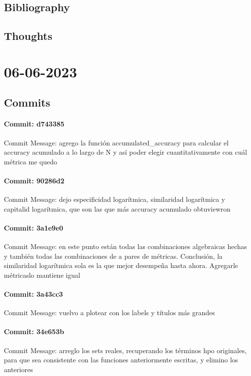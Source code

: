 \documentclass{article}
\begin{document}
\subsection{Bibliography}
\subsection{Thoughts}

\section{06-06-2023}
\subsection{Commits}
\paragraph{Commit: d743385}
Commit Message: agrego la función accumulated_accuracy para calcular el accuracy acumulado a lo largo de N y así poder elegir cuantitativamente con cuál métrica me quedo

\paragraph{Commit: 90286d2}
Commit Message: dejo especificidad logarítmica, similaridad logarítmica y capitalid logarítmica, que son las que más accuracy acumulado obtuviewron

\paragraph{Commit: 3a1e9e0}
Commit Message: en este punto están todas las combinaciones algebraicas hechas y también todas las combinaciones de a pares de métricas. Conclusión, la similaridad logarítmica sola es la que mejor desempeña hasta ahora. Agregarle métricaslo mantiene igual

\paragraph{Commit: 3a43cc3}
Commit Message: vuelvo a plotear con los labels y títulos más grandes

\paragraph{Commit: 34e653b}
Commit Message: arreglo los sets reales, recuperando los términos hpo originales, para que sea consistente con las funciones anteriormente escritas, y elimino los anteriores
\end{document}
